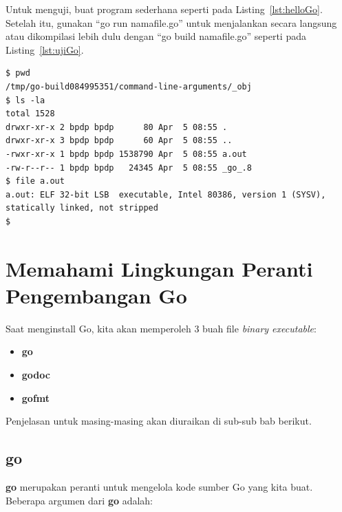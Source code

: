 Untuk menguji, buat program sederhana seperti pada Listing~\ref{lst:helloGo}. Setelah itu, gunakan ``go run namafile.go'' untuk menjalankan secara langsung atau dikompilasi lebih dulu dengan ``go build namafile.go'' seperti pada Listing~\ref{lst:ujiGo}.
	




\begin{mdframed}[style=catatan]
\begin{verbatim}
$ pwd
/tmp/go-build084995351/command-line-arguments/_obj
$ ls -la
total 1528
drwxr-xr-x 2 bpdp bpdp      80 Apr  5 08:55 .
drwxr-xr-x 3 bpdp bpdp      60 Apr  5 08:55 ..
-rwxr-xr-x 1 bpdp bpdp 1538790 Apr  5 08:55 a.out
-rw-r--r-- 1 bpdp bpdp   24345 Apr  5 08:55 _go_.8
$ file a.out 
a.out: ELF 32-bit LSB  executable, Intel 80386, version 1 (SYSV), statically linked, not stripped
$
\end{verbatim}
\end{mdframed}

\section{Memahami Lingkungan Peranti Pengembangan Go}

Saat menginstall Go, kita akan memperoleh 3 buah file \textit{binary executable}:
\begin{itemize}
	\item \textbf{go}
	\item \textbf{godoc}
	\item \textbf{gofmt}
\end{itemize}

Penjelasan untuk masing-masing akan diuraikan di sub-sub bab berikut.

\subsection{go}

\textbf{go} merupakan peranti untuk mengelola kode sumber Go yang kita buat. Beberapa argumen dari \textbf{go} adalah:



